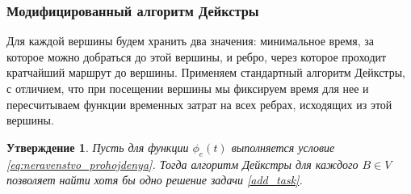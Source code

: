 \documentclass[12pt, a4paper]{article}
\newtheorem{state}{Утверждение}[section]
\begin{document}
	\subsubsection{Модифицированный алгоритм Дейкстры}
	
	Для каждой вершины будем хранить два значения: минимальное время, за которое можно добраться до этой вершины, и ребро, через которое проходит кратчайший маршрут до вершины.
	Применяем стандартный алгоритм Дейкстры, с отличием, что при посещении вершины мы фиксируем время для нее и пересчитываем функции временных затрат на всех ребрах, исходящих из этой вершины.
	
	\begin{state}
		\label{utv:Deikstra}
		Пусть для функции $\phi_e(t)$ выполняется условие \eqref{eq:neravenstvo_prohojdenya}. Тогда алгоритм Дейкстры для каждого $B \in V$ позволяет найти хотя бы одно решение задачи \eqref{add_task}.
	\end{state}
	
\end{document}
